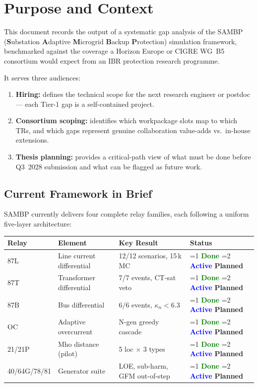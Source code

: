 \documentclass[11pt, a4paper]{article}
\newcommand{\status}[1]{%
  \ifnum#1=1
    \colorbox{green!15}{\textcolor{green}{\textbf{\footnotesize Done}}}%
  \else\ifnum#1=2
    \colorbox{blue!12}{\textcolor{blue}{\textbf{\footnotesize Active}}}%
  \else
    \colorbox{slate!12}{\textcolor{slate}{\textbf{\footnotesize Planned}}}%
  \fi\fi
}
\begin{document}
\section{Purpose and Context}

This document records the output of a systematic gap analysis of the SAMBP
(\textbf{S}ubstation \textbf{A}daptive \textbf{M}icrogrid \textbf{B}ackup
\textbf{P}rotection) simulation framework, benchmarked against the coverage a
Horizon Europe or CIGRE WG~B5 consortium would expect from an IBR protection
research programme.

It serves three audiences:

\begin{enumerate}
  \item \textbf{Hiring:} defines the technical scope for the next research
        engineer or postdoc — each Tier-1 gap is a self-contained project.
  \item \textbf{Consortium scoping:} identifies which workpackage slots map to
        which TRs, and which gaps represent genuine collaboration value-adds vs.\
        in-house extensions.
  \item \textbf{Thesis planning:} provides a critical-path view of what must be
        done before Q3~2028 submission and what can be flagged as future work.
\end{enumerate}

\subsection{Current Framework in Brief}

SAMBP currently delivers four complete relay families, each following a
uniform five-layer architecture:

\begin{center}
\small
\begin{tabular}{@{}llll@{}}
\toprule
\textbf{Relay} & \textbf{Element} & \textbf{Key Result} & \textbf{Status} \\
\midrule
87L & Line current differential & 12/12 scenarios, 15\,k MC & \status{1} \\
87T & Transformer differential  & 7/7 events, CT-sat veto & \status{1} \\
87B & Bus differential          & 6/6 events, $\kappa_n < 6.3$ & \status{1} \\
OC  & Adaptive overcurrent      & N-gen greedy cascade & \status{1} \\
21/21P & Mho distance (pilot)  & 5 loc $\times$ 3 types & \status{2} \\
40/64G/78/81 & Generator suite & LOE, sub-harm, GFM out-of-step & \status{2} \\
\bottomrule
\end{tabular}
\end{center}
\end{document}
